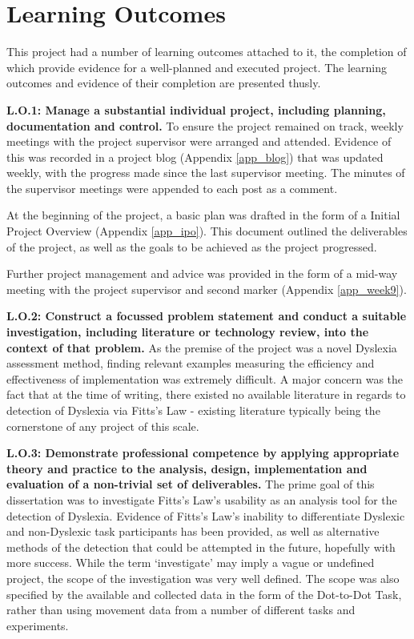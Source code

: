 		\newpage
		
	\section{Learning Outcomes}
		This project had a number of learning outcomes attached to it, the completion of which provide evidence for a well-planned and executed project. The learning outcomes and evidence of their completion are presented thusly.
		
		\textbf{L.O.1: Manage a substantial individual project, including planning, documentation and control.}
		To ensure the project remained on track, weekly meetings with the project supervisor were arranged and attended. Evidence of this was recorded in a project blog (Appendix \ref{app_blog}) that was updated weekly, with the progress made since the last supervisor meeting. The minutes of the supervisor meetings were appended to each post as a comment.
		
		At the beginning of the project, a basic plan was drafted in the form of a Initial Project Overview (Appendix \ref{app_ipo}). This document outlined the deliverables of the project, as well as the goals to be achieved as the project progressed. 
		
		Further project management and advice was provided in the form of a mid-way meeting with the project supervisor and second marker (Appendix \ref{app_week9}).
		
		\textbf{L.O.2: Construct a focussed problem statement and conduct a suitable investigation, including literature or technology review, into the context of that problem.}
		As the premise of the project was a novel Dyslexia assessment method, finding relevant examples measuring the efficiency and effectiveness of implementation was extremely difficult. A major concern was the fact that at the time of writing, there existed no available literature in regards to detection of Dyslexia via Fitts’s Law - existing literature typically being the cornerstone of any project of this scale.
		
		\textbf{L.O.3: Demonstrate professional competence by applying appropriate theory and practice to the analysis, design, implementation and evaluation of a non-trivial set of deliverables.}
		The prime goal of this dissertation was to investigate Fitts’s Law’s usability as an analysis tool for the detection of Dyslexia. Evidence of Fitts’s Law’s inability to differentiate Dyslexic and non-Dyslexic task participants has been provided, as well as alternative methods of the detection that could be attempted in the future, hopefully with more success. While the term ‘investigate’ may imply a vague or undefined project, the scope of the investigation was very well defined. The scope was also specified by the available and collected data in the form of the Dot-to-Dot Task, rather than using movement data from a number of different tasks and experiments. 
		
